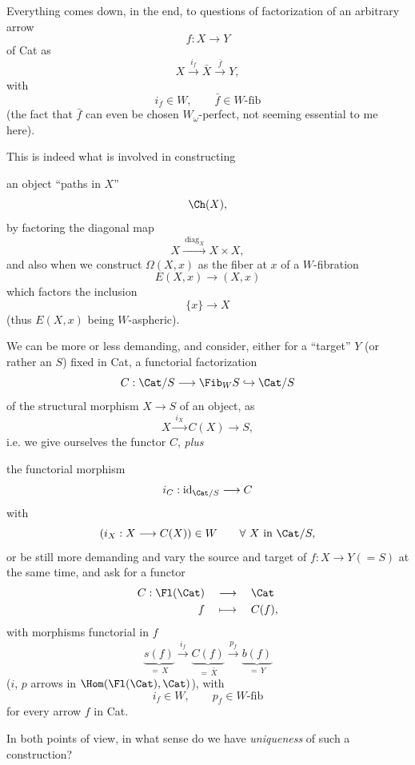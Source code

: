 Everything comes down, in the end, to questions of factorization of an arbitrary arrow
\[
f : X \longrightarrow Y
\]
of Cat as
\[
X \xrightarrow{\ i_f\ } \bar{X} \xrightarrow{\ \bar{f}\ } Y,
\]
with
\[
i_f \in W, \qquad \bar{f} \in W\text{-fib}
\]
(the fact that $\bar{f}$ can even be chosen $W_\omega$-perfect, not seeming essential to me here).

This is indeed what is involved in constructing

an object ``paths in $X$''
\[
\Ch(X),
\]
by factoring the diagonal map
\[
X \xrightarrow{\ \mathrm{diag}_X\ } X \times X,
\]
and also when we construct $\Omega(X,x)$ as the fiber at $x$ of a $W$-fibration
\[
E(X,x) \longrightarrow (X,x)
\]
which factors the inclusion
\[
\{x\} \longrightarrow X
\]
(thus $E(X,x)$ being $W$-aspheric).

We can be more or less demanding, and consider, either for a ``target'' $Y$ (or rather an $S$) fixed in Cat, a functorial factorization
\[
C : \Cat/S \longrightarrow \Fib_W S \hookrightarrow \Cat/S
\]
of the structural morphism $X \longrightarrow S$ of an object, as
\[
X \xrightarrow{\ i_X\ } C(X) \longrightarrow S,
\]
i.e. we give ourselves the functor $C$, \textit{plus}

the functorial morphism
\[
i_C : \mathrm{id}_{\Cat/S} \longrightarrow C
\]
with
\[
(i_X : X \longrightarrow C(X)) \in W \qquad \forall\ X \text{ in } \Cat/S,
\]
or be still more demanding and vary the source and target of $f : X \longrightarrow Y (= S)$ at the same time, and ask for a functor
\[
\begin{aligned}
C : \Fl(\Cat) \quad &\longrightarrow \quad \Cat \\
f \quad &\longmapsto \quad C(f),
\end{aligned}
\]
with morphisms functorial in $f$
\[
\underbrace{s(f)}_{=\,X} \xrightarrow{\ i_f\ } \underbrace{C(f)}_{=\,\bar{X}} \xrightarrow{\ p_f\ } \underbrace{b(f)}_{=\,Y}
\]
($i$, $p$ arrows in $\Hom(\Fl(\Cat),\Cat)$), with
\[
i_f \in W, \qquad p_f \in W\text{-fib}
\]
for every arrow $f$ in Cat.

In both points of view, in what sense do we have \textit{uniqueness} of such a construction?

